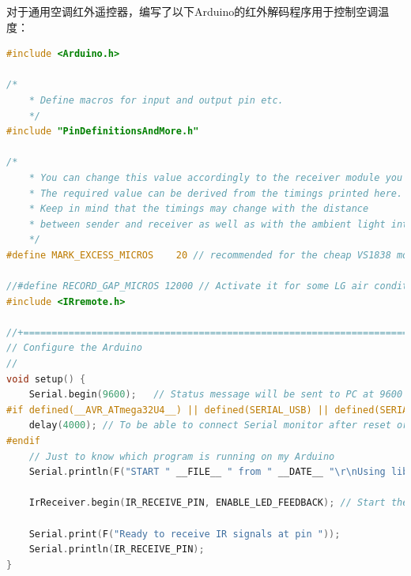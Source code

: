 对于通用空调红外遥控器，编写了以下Arduino的红外解码程序用于控制空调温度：
\begin{lstlisting}[language=C,title=代码4-1: Arduino的红外解码程序]
#include <Arduino.h>

/*
	* Define macros for input and output pin etc.
	*/
#include "PinDefinitionsAndMore.h"

/*
	* You can change this value accordingly to the receiver module you use.
	* The required value can be derived from the timings printed here.
	* Keep in mind that the timings may change with the distance
	* between sender and receiver as well as with the ambient light intensity.
	*/
#define MARK_EXCESS_MICROS    20 // recommended for the cheap VS1838 modules

//#define RECORD_GAP_MICROS 12000 // Activate it for some LG air conditioner protocols
#include <IRremote.h>

//+=============================================================================
// Configure the Arduino
//
void setup() {
	Serial.begin(9600);   // Status message will be sent to PC at 9600 baud
#if defined(__AVR_ATmega32U4__) || defined(SERIAL_USB) || defined(SERIAL_PORT_USBVIRTUAL)  || defined(ARDUINO_attiny3217)
	delay(4000); // To be able to connect Serial monitor after reset or power up and before first print out. Do not wait for an attached Serial Monitor!
#endif
	// Just to know which program is running on my Arduino
	Serial.println(F("START " __FILE__ " from " __DATE__ "\r\nUsing library version " VERSION_IRREMOTE));

	IrReceiver.begin(IR_RECEIVE_PIN, ENABLE_LED_FEEDBACK); // Start the receiver, enable feedback LED, take LED feedback pin from the internal boards definition

	Serial.print(F("Ready to receive IR signals at pin "));
	Serial.println(IR_RECEIVE_PIN);
}


\end{lstlisting}
